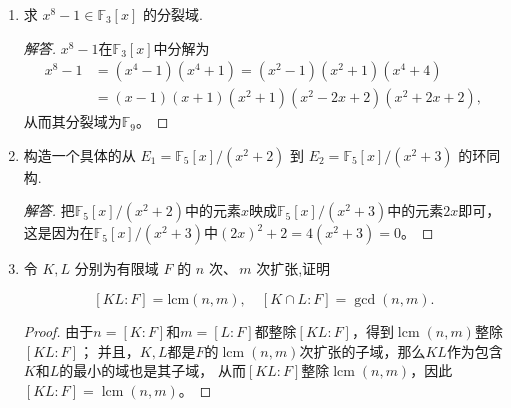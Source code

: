 \begin{enumerate}
\begin{proof}[解答]
    (2) 由于$(\alpha^2+1)\alpha=(\alpha+2)\alpha=1$，可知$\beta$的逆是$\alpha$。
\end{proof}
\item 求 $x^8 - 1 \in \mathbb{F}_3[x]$ 的分裂域.
\begin{proof}[解答]
    $x^8-1$在$\mathbb{F}_3[x]$中分解为
    \begin{align*}
        x^8-1&=(x^4-1)(x^4+1)=(x^2-1)(x^2+1)(x^4+4)\\
        &=(x-1)(x+1)(x^2+1)(x^2-2x+2)(x^2+2x+2),
    \end{align*}
    从而其分裂域为$\mathbb{F}_9$。
\end{proof}

\item 构造一个具体的从 $E_1 = \mathbb{F}_5[x]/(x^2 + 2)$ 到 $E_2 = \mathbb{F}_5[x]/(x^2 + 3)$ 的环同构.
\begin{proof}[解答]
    把$\mathbb{F}_5[x]/(x^2+2)$中的元素$x$映成$\mathbb{F}_5[x]/(x^2+3)$中的元素$2x$即可，
    这是因为在$\mathbb{F}_5[x]/(x^2+3)$中$(2x)^2+2=4(x^2+3)=0$。
\end{proof}
\item 令 $K, L$ 分别为有限域 $F$ 的 $n$ 次、\,$m$ 次扩张,证明

\[
[KL : F] = \text{lcm}(n, m), \quad [K \cap L : F] = \gcd(n, m).
\]
\begin{proof}
    由于$n=[K:F]$和$m=[L:F]$都整除$[KL:F]$，得到$\operatorname{lcm}(n,m)$整除$[KL:F]$；
    并且，$K,L$都是$F$的$\operatorname{lcm}(n,m)$次扩张的子域，那么$KL$作为包含$K$和$L$的最小的域也是其子域，
    从而$[KL:F]$整除$\operatorname{lcm}(n,m)$，因此$[KL:F]=\operatorname{lcm}(n,m)$。
    

\end{proof}
\end{enumerate}
